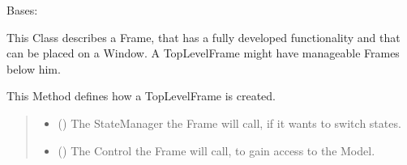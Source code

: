 \documentclass[letterpaper,10pt,english]{sphinxmanual}
\begin{document}
\begin{fulllineitems}
\label{\detokenize{apidoc/src.osm_configurator.view.toplevelframes:src.osm_configurator.view.toplevelframes.top_level_frame.TopLevelFrame}}
\pysigstartsignatures
{}
\pysigstopsignatures
\sphinxAtStartPar
Bases: 

\sphinxAtStartPar
This Class describes a Frame, that has a fully developed functionality and that can be placed on a Window.
A TopLevelFrame might have manageable Frames below him.

\begin{fulllineitems}
\label{\detokenize{apidoc/src.osm_configurator.view.toplevelframes:src.osm_configurator.view.toplevelframes.top_level_frame.TopLevelFrame.__init__}}
\pysigstartsignatures
{}
\pysigstopsignatures
\sphinxAtStartPar
This Method defines how a TopLevelFrame is created.
\begin{quote}\begin{description}
\begin{itemize}
\item {} 
\sphinxAtStartPar
{} ({\hyperref[\detokenize{apidoc/src.osm_configurator.view.states:src.osm_configurator.view.states.state_manager.StateManager}]{}}) \textendash{} The StateManager the Frame will call, if it wants to switch states.

\item {} 
\sphinxAtStartPar
{} ({\hyperref[\detokenize{apidoc/src.osm_configurator.control:src.osm_configurator.control.control_interface.IControl}]{}}) \textendash{} The Control the Frame will call, to gain access to the Model.

\end{itemize}

\end{description}\end{quote}

\end{fulllineitems}


\end{fulllineitems}
\end{document}
